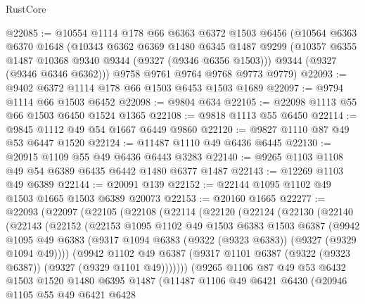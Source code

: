 \begin{lexlean}{RustCore}
\begin{coremodule}
@22085 := @10554
    @1114
    @178
    @66
    @6363
    @6372
    @1503
    @6456
    (@10564
      @6363
      @6370
      @1648
      (@10343
        @6362
        @6369
        @1480
        @6345
        @1487
        @9299
        (@10357 @6355 @1487 @10368 @9340 @9344 (@9327 (@9346 @6356 @1503)))
        @9344
        (@9327 (@9346 @6346 @6362)))
      @9758
      @9761
      @9764
      @9768
      @9773
      @9779)
@22093 := @9402 @6372 @1114 @178 @66 @1503 @6453 @1503 @1689
@22097 := @9794 @1114 @66 @1503 @6452
@22098 := @9804 @634
@22105 := @22098 @1113 @55 @66 @1503 @6450 @1524 @1365
@22108 := @9818 @1113 @55 @6450
@22114 := @9845 @1112 @49 @54 @1667 @6449 @9860
@22120 := @9827 @1110 @87 @49 @53 @6447 @1520
@22124 := @11487 @1110 @49 @6436 @6445
@22130 := @20915 @1109 @55 @49 @6436 @6443 @3283
@22140 := @9265 @1103 @1108 @49 @54 @6389 @6435 @6442 @1480 @6377 @1487
@22143 := @12269 @1103 @49 @6389
@22144 := @20091 @139
@22152 := @22144 @1095 @1102 @49 @1503 @1665 @1503 @6389 @20073
@22153 := @20160 @1665
@22277 := @22093
    (@22097
      (@22105
        (@22108
          (@22114
            (@22120
              (@22124
                (@22130
                  (@22140
                    (@22143
                      (@22152
                        (@22153
                          @1095
                          @1102
                          @49
                          @1503
                          @6383
                          @1503
                          @6387
                          (@9942
                            @1095
                            @49
                            @6383
                            (@9317 @1094 @6383 (@9322 (@9323 @6383)) (@9327 (@9329 @1094 @49))))
                          (@9942
                            @1102
                            @49
                            @6387
                            (@9317 @1101 @6387 (@9322 (@9323 @6387)) (@9327 (@9329 @1101 @49)))))))
                    (@9265
                      @1106
                      @87
                      @49
                      @53
                      @6432
                      @1503
                      @1520
                      @1480
                      @6395
                      @1487
                      (@11487
                        @1106
                        @49
                        @6421
                        @6430
                        (@20946
                          @1105
                          @55
                          @49
                          @6421
                          @6428

\end{coremodule}
\end{lexlean}
